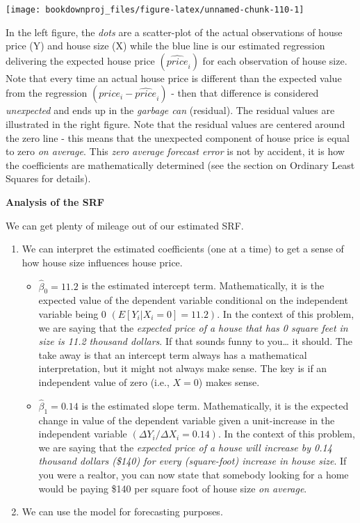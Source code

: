 \documentclass[
]{book}
\begin{document}
\begin{center}\texttt{[image: bookdownproj\_files/figure-latex/unnamed-chunk-110-1]} \end{center}

In the left figure, the \emph{dots} are a scatter-plot of the actual observations of house price (Y) and house size (X) while the blue line is our estimated regression delivering the expected house price \((\widehat{price}_i)\) for each observation of house size. Note that every time an actual house price is different than the expected value from the regression \((price_i - \widehat{price}_i)\) - then that difference is considered \emph{unexpected} and ends up in the \emph{garbage can} (residual). The residual values are illustrated in the right figure. Note that the residual values are centered around the zero line - this means that the unexpected component of house price is equal to zero \emph{on average}. This \emph{zero average forecast error} is not by accident, it is how the coefficients are mathematically determined (see the section on Ordinary Least Squares for details).

\textbf{Analysis of the SRF}

We can get plenty of mileage out of our estimated SRF.

\begin{enumerate}
\def\labelenumi{\arabic{enumi}.}
\item
  We can interpret the estimated coefficients (one at a time) to get a sense of how house size influences house price.

  \begin{itemize}
  \item
    \(\hat{\beta}_0=11.2\) is the estimated intercept term. Mathematically, it is the expected value of the dependent variable conditional on the independent variable being 0 \((E[Y_i|X_i=0]=11.2)\). In the context of this problem, we are saying that the \emph{expected price of a house that has 0 square feet in size is 11.2 thousand dollars}. If that sounds funny to you\ldots{} it should. The take away is that an intercept term always has a mathematical interpretation, but it might not always make sense. The key is if an independent value of zero (i.e., \(X=0\)) makes sense.
  \item
    \(\hat{\beta}_1=0.14\) is the estimated slope term. Mathematically, it is the expected change in value of the dependent variable given a unit-increase in the independent variable \((\Delta Y_i/\Delta X_i=0.14)\). In the context of this problem, we are saying that the \emph{expected price of a house will increase by 0.14 thousand dollars (\$140) for every (square-foot) increase in house size}. If you were a realtor, you can now state that somebody looking for a home would be paying \$140 per square foot of house size \emph{on average}.
  \end{itemize}
\item
  We can use the model for forecasting purposes.
\end{enumerate}
\end{document}
